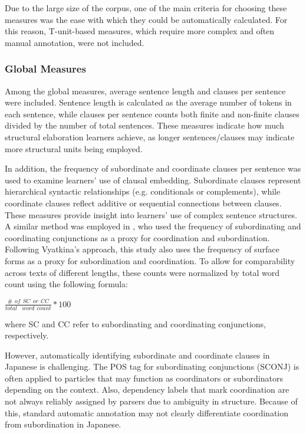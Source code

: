 Due to the large size of the corpus, one of the main criteria for choosing these measures was the ease with which
they could be automatically calculated. For this reason, T-unit-based measures, which require more complex and often
manual annotation, were not included.

\subsubsection{Global Measures}
Among the global measures, average sentence length and clauses per sentence were included. Sentence length is
calculated as the average number of tokens in each sentence, while clauses per sentence counts both finite and
non-finite clauses divided by the number of total sentences. These measures indicate how much structural elaboration
learners achieve, as longer sentences/clauses may indicate more structural units being employed.

In addition, the frequency of subordinate and coordinate clauses per sentence was used to examine learners' use of
clausal embedding.
Subordinate clauses represent hierarchical syntactic relationships (e.g. conditionals or complements),
while coordinate clauses reflect additive or sequential connections between clauses. These measures provide insight
into learners'
use of complex sentence structures. A similar method was employed in \citet{Vyatkina2012}, who used the frequency of
subordinating and
coordinating conjunctions as a proxy for coordination and subordination.
Following Vyatkina's approach, this study also uses the frequency of surface forms as a proxy for subordination and
coordination. To
allow for comparability across texts of different lengths, these counts were normalized by total word count using the
following formula:
\begin{center}
${\displaystyle \frac{\# \hspace{5pt} of \hspace{5pt}SC \hspace{5pt}or \hspace{5pt}CC}{total \hspace{5pt} \hspace{
5pt}word \hspace{5pt}count} }  * 100$
\end{center}
where SC and CC refer to subordinating and coordinating conjunctions, respectively.

However, automatically identifying subordinate and coordinate clauses in Japanese is challenging. The POS tag for
subordinating conjunctions (SCONJ) is often applied to particles that may function as coordinators or subordinators
depending on the context. Also, dependency labels that mark coordination are not always reliably assigned by parsers
due to ambiguity in structure\citep{UDJapanese}. Because of this, standard automatic annotation may not clearly
differentiate coordination from subordination in Japanese.

